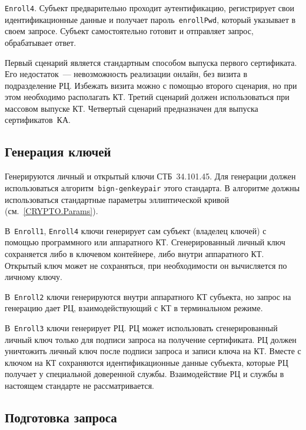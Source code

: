 \texttt{Enroll4}.
Субъект предварительно проходит аутентификацию, регистрирует свои 
идентификационные данные и получает пароль~\texttt{enrollPwd}, 
который указывает в своем запросе. Субъект самостоятельно готовит и 
отправляет запрос, обрабатывает ответ.

Первый сценарий является стандартным способом выпуска первого сертификата. 
Его недостаток~--- невозможность реализации онлайн, 
без визита в подразделение РЦ. Избежать визита можно с помощью второго 
сценария, но при этом необходимо располагать КТ. 
%
Третий сценарий должен использоваться при массовом выпуске КТ.
%
Четвертый сценарий предназначен для выпуска сертификатов~КА.

\subsection{Генерация ключей}\label{PROCESSES.Enroll.Gen}

Генерируются личный и открытый ключи СТБ~34.101.45.
Для генерации должен использоваться алгоритм~\texttt{bign-genkeypair}
этого стандарта. В алгоритме должны использоваться 
стандартные параметры эллиптической кривой (см.~\ref{CRYPTO.Params}).

В~\texttt{Enroll1}, \texttt{Enroll4} ключи генерирует сам субъект 
(владелец ключей) с помощью программного или аппаратного КТ. 
Сгенерированный личный ключ сохраняется либо в ключевом контейнере, либо 
внутри аппаратного КТ. Открытый ключ может не сохраняться, при необходимости он 
вычисляется по личному ключу.


В~\texttt{Enroll2} ключи генерируются внутри аппаратного КТ субъекта,
но запрос на генерацию дает РЦ, взаимодействующий с КТ в терминальном 
режиме. 

В~\texttt{Enroll3} ключи генерирует РЦ. 
РЦ может использовать сгенерированный личный ключ только для 
подписи запроса на получение сертификата. РЦ должен уничтожить личный ключ 
после подписи запроса и записи ключа на КТ.
%
Вместе с ключом на КТ сохраняются идентификационные данные субъекта,
которые РЦ получает у специальной доверенной службы. 
Взаимодействие РЦ и службы в настоящем стандарте не рассматривается.

\subsection{Подготовка запроса}\label{PROCESSES.Enroll.CSR}

